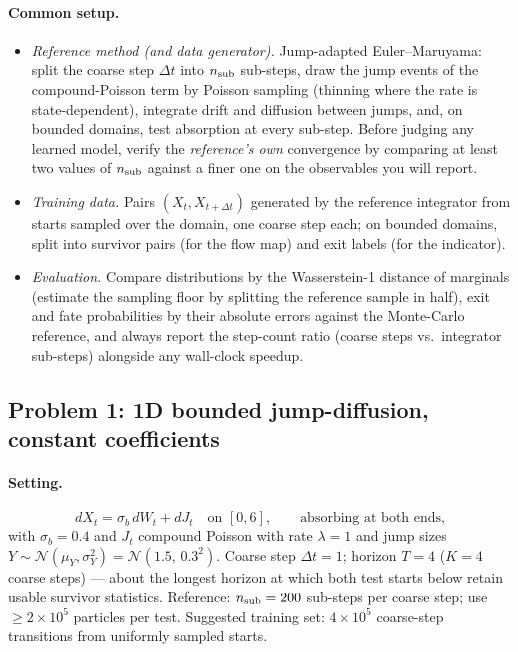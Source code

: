 \documentclass[11pt]{article}
\begin{document}
\paragraph{Common setup.}
\begin{itemize}[leftmargin=1.4em]
\item \emph{Reference method (and data generator).} Jump-adapted
  Euler--Maruyama: split the coarse step $\Delta t$ into $n_{\rm sub}$
  sub-steps, draw the jump events of the compound-Poisson term by Poisson
  sampling (thinning where the rate is state-dependent), integrate drift
  and diffusion between jumps, and, on bounded domains, test absorption at
  every sub-step. Before judging any learned model, verify the
  \emph{reference's own} convergence by comparing at least two values of
  $n_{\rm sub}$ against a finer one on the observables you will report.
\item \emph{Training data.} Pairs $(X_t, X_{t+\Delta t})$ generated by
  the reference integrator from starts sampled over the domain, one
  coarse step each; on bounded domains, split into survivor pairs (for
  the flow map) and exit labels (for the indicator).
\item \emph{Evaluation.} Compare distributions by the Wasserstein-1
  distance of marginals (estimate the sampling floor by splitting the
  reference sample in half), exit and fate probabilities by their
  absolute errors against the Monte-Carlo reference, and always report
  the step-count ratio (coarse steps vs.\ integrator sub-steps) alongside
  any wall-clock speedup.
\end{itemize}

\subsection{Problem 1: 1D bounded jump-diffusion, constant coefficients}

\paragraph{Setting.}
\begin{equation*}
dX_t = \sigma_b\,dW_t + dJ_t \quad\text{on } [0,6],
\qquad \text{absorbing at both ends,}
\end{equation*}
with $\sigma_b=0.4$ and $J_t$ compound Poisson with rate $\lambda=1$ and
jump sizes $Y\sim\mathcal N(\mu_Y,\sigma_Y^2)=\mathcal N(1.5,\,0.3^2)$.
Coarse step $\Delta t=1$; horizon $T=4$ ($K=4$ coarse steps) --- about
the longest horizon at which both test starts below retain usable
survivor statistics. Reference: $n_{\rm sub}=200$ sub-steps per coarse
step; use $\ge 2\times10^5$ particles per test. Suggested training set:
$4\times10^5$ coarse-step transitions from uniformly sampled starts.
\end{document}
